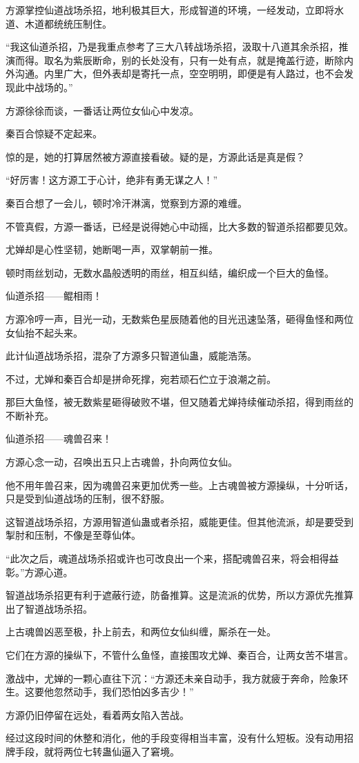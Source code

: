 \begin{this_body}
方源掌控仙道战场杀招，地利极其巨大，形成智道的环境，一经发动，立即将水道、木道都统统压制住。

“我这仙道杀招，乃是我重点参考了三大八转战场杀招，汲取十八道其余杀招，推演而得。取名为紫辰断命，别的长处没有，只有一处有点，就是掩盖行迹，断除内外沟通。内里广大，但外表却是寄托一点，空空明明，即便是有人路过，也不会发现此中战场的。”

方源徐徐而谈，一番话让两位女仙心中发凉。

秦百合惊疑不定起来。

惊的是，她的打算居然被方源直接看破。疑的是，方源此话是真是假？

“好厉害！这方源工于心计，绝非有勇无谋之人！”

秦百合想了一会儿，顿时冷汗淋漓，觉察到方源的难缠。

不管真假，方源一番话，已经是说得她心中动摇，比大多数的智道杀招都要见效。

尤婵却是心性坚韧，她断喝一声，双掌朝前一推。

顿时雨丝划动，无数水晶般透明的雨丝，相互纠结，编织成一个巨大的鱼怪。

仙道杀招——鲲相雨！

方源冷哼一声，目光一动，无数紫色星辰随着他的目光迅速坠落，砸得鱼怪和两位女仙抬不起头来。

此计仙道战场杀招，混杂了方源多只智道仙蛊，威能浩荡。

不过，尤婵和秦百合却是拼命死撑，宛若顽石伫立于浪潮之前。

那巨大鱼怪，被无数紫星砸得破败不堪，但又随着尤婵持续催动杀招，得到雨丝的不断补充。

仙道杀招——魂兽召来！

方源心念一动，召唤出五只上古魂兽，扑向两位女仙。

他不用年兽召来，因为魂兽召来更加优秀一些。上古魂兽被方源操纵，十分听话，只是受到仙道战场的压制，很不舒服。

这智道战场杀招，方源用智道仙蛊或者杀招，威能更佳。但其他流派，却是要受到掣肘和压制，不像是至尊仙体。

“此次之后，魂道战场杀招或许也可改良出一个来，搭配魂兽召来，将会相得益彰。”方源心道。

智道战场杀招更有利于遮蔽行迹，防备推算。这是流派的优势，所以方源优先推算出了智道战场杀招。

上古魂兽凶恶至极，扑上前去，和两位女仙纠缠，厮杀在一处。

它们在方源的操纵下，不管什么鱼怪，直接围攻尤婵、秦百合，让两女苦不堪言。

激战中，尤婵的一颗心直往下沉：“方源还未亲自动手，我方就疲于奔命，险象环生。这要他忽然动手，我们恐怕凶多吉少！”

方源仍旧停留在远处，看着两女陷入苦战。

经过这段时间的休整和消化，他的手段变得相当丰富，没有什么短板。没有动用招牌手段，就将两位七转蛊仙逼入了窘境。

\end{this_body}

